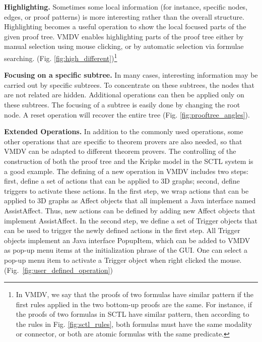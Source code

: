 \documentclass[runningheads]{llncs}
\newcommand\tool[1]{\textsf{#1}}
\newcommand\vmdv{\tool{VMDV}}
\begin{document}
\hspace{-0.48cm}
{\bf Highlighting.}
Sometimes some local information (for instance, specific nodes, edges, or proof patterns) is more interesting rather than the overall structure. Highlighting becomes a useful operation to show the local focused parts of the given proof tree. \vmdv{} enables highlighting parts of the proof tree either by manual selection using mouse clicking, or by automatic selection via formulae searching. (Fig. \ref{fig:high_different})\footnote{In \vmdv{}, we say that the proofs of two formulas have similar pattern if the first rules applied in the two bottom-up proofs are the same. For instance, if the proofs of two formulas in \textsf{SCTL} have similar pattern, then according to the rules in Fig. \ref{fig:sctl_rules}, both formulas must have the same modality or connector, or both are atomic formulas with the same predicate.}
\smallskip

\hspace{-0.5cm}
{\bf Focusing on a specific subtree.}
In many cases, interesting information may be carried out by specific subtrees. To concentrate on these subtrees, the nodes that are not related are hidden. Additional operations can then be applied only on these subtrees. The focusing of a subtree is easily done by changing the root node. A reset operation will recover the entire tree (Fig. \ref{fig:prooftree_angles}).
 
 
\vspace{0.1cm}
\hspace{-0.5cm}
{\bf Extended Operations.}
In addition to the commonly used operations, some other operations that are specific to theorem provers are also needed, so that \vmdv{} can be adapted to different theorem provers. The controlling of the construction of both the proof tree and the Kripke model in the \textsf{SCTL} system is a good example. The defining of a new operation in \vmdv{} includes two steps: first, define a set of actions that can be applied to 3D graphs; second, define triggers to activate these actions. In the first step, we wrap actions that can be applied to 3D graphs as \textsf{Affect} objects that all implement a Java interface named \textsf{AssistAffect}. Thus, new actions can be defined by adding new \textsf{Affect} objects that implement \textsf{AssistAffect}. In the second step, we define a set of \textsf{Trigger} objects that can be used to trigger the newly defined actions in the first step. All \textsf{Trigger} objects implement an Java interface \textsf{PopupItem}, which can be added to \vmdv{} as pop-up menu items at the initialization phrase of the GUI. One can select a pop-up menu item to activate a \textsf{Trigger} object when right clicked the mouse. (Fig.~\ref{fig:user_defined_operation})
 
\end{document}
